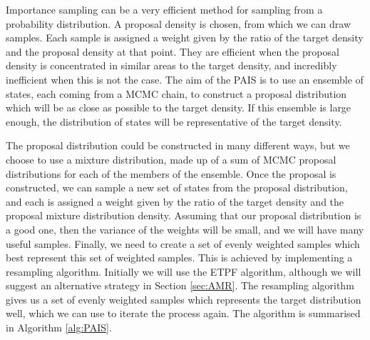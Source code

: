 \documentclass[final]{siamltex}
\begin{document}


Importance sampling can be a very efficient method for sampling from a
probability distribution. A proposal density is chosen, from which we
can draw samples. Each sample is assigned a weight given by the
ratio of the target density and the proposal density at that
point. They are efficient when the proposal density is concentrated in
similar areas to the target density, and incredibly inefficient when
this is not the case. The aim of the PAIS is to use an ensemble of states,
each coming from a MCMC chain, to construct a proposal
distribution which will be as close as possible to the target density. If this
ensemble is large enough, the distribution of states will be representative
of the target density.

The proposal distribution could be constructed in many different ways,
but we choose to use a mixture distribution, made up of a sum of MCMC
proposal distributions for each of the members of the ensemble. Once the proposal is
constructed, we can sample a new set of states from the proposal
distribution, and each is assigned a weight given by the ratio of the target
density and the proposal mixture distribution density. Assuming that
our proposal distribution is a good one, then the variance of the
weights will be small, and we will have many useful samples. Finally, we
need to create a set of evenly weighted samples which best represent
this set of weighted samples. This is achieved by implementing a
resampling algorithm. Initially we will use the ETPF
algorithm\cite{reich2013nonparametric}, although we will suggest an
alternative strategy in Section \ref{sec:AMR}. The resampling
algorithm gives us a set of evenly weighted samples which represents
the target distribution well, which we can use to iterate the process
again. The algorithm is summarised in Algorithm \ref{alg:PAIS}. 
\end{document}
